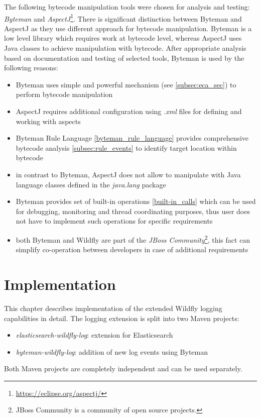 \documentclass[12pt,oneside]{fithesis2}
\begin{document}
The following bytecode manipulation tools were chosen for analysis and testing: \textit{Byteman} and \textit{AspectJ}\footnote{\url{https://eclipse.org/aspectj/}}. There is significant distinction between Byteman and AspectJ as they use different approach for bytecode manipulation. Byteman is a low level library which requires work at bytecode level, whereas AspectJ uses Java classes to achieve manipulation with bytecode. After appropriate analysis based on documentation and testing of selected tools, Byteman is used by the following reasons:

\begin{itemize}
	\item Byteman uses simple and powerful mechanism (see \ref{subsec:eca_sec}) to perform bytecode manipulation 
	\item AspectJ requires additional configuration using \textit{.xml} files for defining and working with aspects \cite[Configuration]{aspectj_doc}
	\item Byteman Rule Language \ref{byteman_rule_language} provides comprehensive bytecode analysis \ref{subsec:rule_events} to identify target location within bytecode
	\item in contrast to Byteman, AspectJ does not allow to manipulate with Java language classes defined in the \textit{java.lang} package \cite[Special cases]{aspectj_doc}
	\item Byteman provides set of built-in operations \ref{built-in_calls} which can be used for debugging, monitoring and thread coordinating purposes, thus user does not have to implement such operations for specific requirements
	\item both Byteman and Wildfly are part of the \textit{JBoss Community}\footnote{JBoss Community is a community of open source projects.}, this fact can simplify co-operation between developers in case of additional requirements
\end{itemize}

\chapter{Implementation}
This chapter describes implementation of the extended Wildfly logging capabilities in detail. The logging extension is split into two Maven projects:

\begin{itemize}
	\item \textit{elasticsearch-wildfly-log}: extension for Elasticsearch
	\item \textit{byteman-wildfly-log}: addition of new log events using Byteman
\end{itemize}

Both Maven projects are completely independent and can be used separately.



\end{document}
